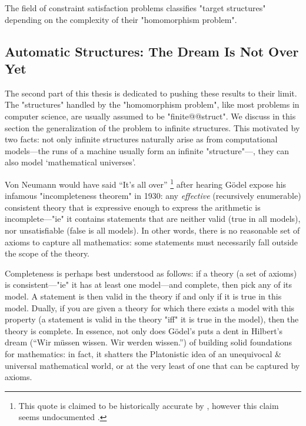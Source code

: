 \begin{known}
	The field of constraint satisfaction problems classifies "target structures"
	depending on the complexity of their "homomorphism problem".
\end{known}

\subsection{Automatic Structures: The Dream Is Not Over Yet}

The second part of this thesis is dedicated to pushing these results to their limit.
The "structures" handled by the "homomorphism problem", like most
problems in computer science, are usually assumed to be "finite@@struct".
We discuss in this section the generalization of the problem to
infinite structures. This motivated by two facts: not only infinite structures
naturally arise as from computational models---the runs of a machine
usually form an infinite "structure"---, they can also model `mathematical universes'.

Von Neumann would have said ``It's all over''%
\footnote{This quote is claimed to be historically accurate by
\cite{2009Logicomix}, however this claim seems undocumented \cite{Mancosu2011Logicomix}.}
after hearing Gödel expose his infamous "incompleteness theorem" in 1930:
any \emph{effective} (recursively enumerable)
consistent theory that is expressive enough to express the arithmetic
is incomplete---"ie" it contains statements that are neither valid (true in all models),
nor unsatisfiable (false is all models).
In other words, there is no reasonable set of axioms
to capture all mathematics: some statements must necessarily fall outside
the scope of the theory.

Completeness is perhaps best understood as follows:
if a theory (a set of axioms) is consistent---"ie" it has at least one model---and complete, 
then pick any of its model. A statement is then valid in the theory if and only
if it is true in this model. Dually, if you are given a theory for which
there exists a model with this property (a statement is valid in the theory "iff" it
is true in the model), then the theory is complete.
In essence, not only does Gödel's puts a dent in Hilbert's dream
(``Wir müssen wissen. Wir werden wissen.'') of building solid foundations for mathematics:
in fact, it shatters the Platonistic idea of an unequivocal \& universal mathematical world, or 
at the very least of one that can be captured by axioms.

